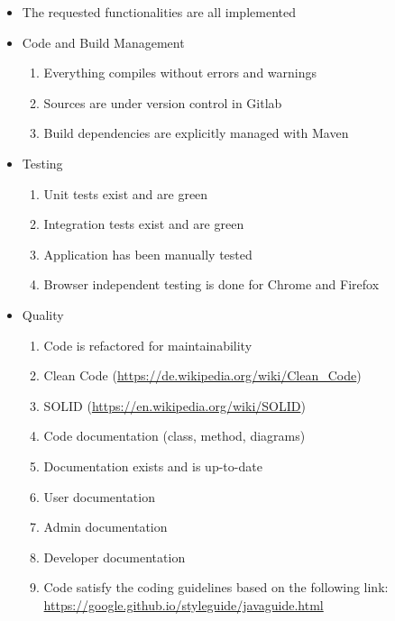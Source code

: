 \begin{itemize}
	\item The requested functionalities are all implemented
	
	\item Code and Build Management
	\begin{enumerate}
		\item Everything compiles without errors and warnings
		\item Sources are under version control in Gitlab
		\item Build dependencies are explicitly managed with Maven
	\end{enumerate}

	\item Testing
	\begin{enumerate}
		\item Unit tests exist and are green
		\item Integration tests exist and are green
		\item Application has been manually tested
		\item Browser independent testing is done for Chrome and Firefox
	\end{enumerate}

	\item Quality
	\begin{enumerate}
		\item Code is refactored for maintainability
		\item Clean Code (\url{https://de.wikipedia.org/wiki/Clean_Code})
		\item SOLID (\url{https://en.wikipedia.org/wiki/SOLID})
		\item Code documentation (class, method, diagrams)
		\item Documentation exists and is up-to-date
		\item User documentation
		\item Admin documentation
		\item Developer documentation
		\item Code satisfy the coding guidelines based on the following link:  \url{https://google.github.io/styleguide/javaguide.html}
	\end{enumerate}	
\end{itemize}